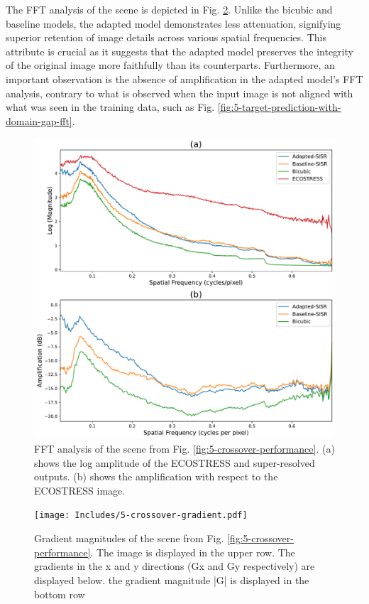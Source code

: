     The FFT analysis of the scene is depicted in Fig. \ref{fig:5-crossover-fft}. Unlike the bicubic and baseline models, the adapted model demonstrates less attenuation, signifying superior retention of image details across various spatial frequencies. This attribute is crucial as it suggests that the adapted model preserves the integrity of the original image more faithfully than its counterparts. Furthermore, an important observation is the absence of amplification in the adapted model's FFT analysis, contrary to what is observed when the input image is not aligned with what was seen in the training data, such as Fig. \ref{fig:5-target-prediction-with-domain-gap-fft}. 

    \begin{figure}[H]
        \centering
        \includegraphics[width=\textwidth]{Includes/5-crossover-performance-fft.pdf}
        \caption{FFT analysis of the scene from Fig. \ref{fig:5-crossover-performance}. (a) shows the log amplitude of the ECOSTRESS and super-resolved outputs. (b) shows the amplification with respect to the ECOSTRESS image.}
        \label{fig:5-crossover-fft}
    \end{figure}

    \begin{figure}[H]
        \centering
        \texttt{[image: Includes/5-crossover-gradient.pdf]}
        \caption{Gradient magnitudes of the scene from Fig. \ref{fig:5-crossover-performance}. The image is displayed in the upper row. The gradients in the x and y directions (Gx and Gy respectively) are
displayed below. the gradient magnitude |G| is displayed in the bottom row}
        \label{fig:5-crossover-fft}
    \end{figure}

